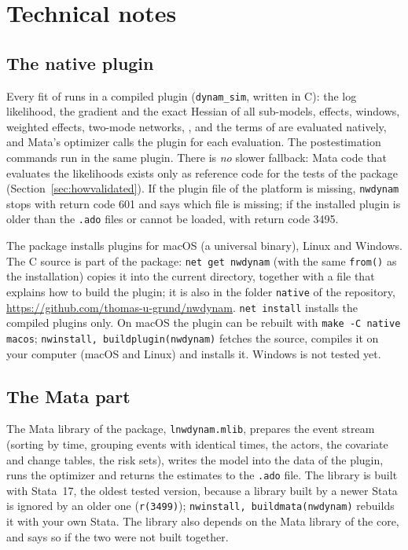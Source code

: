 \chapter{Technical notes}\label{ch:technical}

\section{The native plugin}\label{sec:plugin}

Every fit of \nwdynam{} runs in a compiled plugin (\texttt{dynam\_sim}, written in C): the log likelihood, the gradient and the exact Hessian of all sub-models, effects, windows, weighted effects, two-mode networks, ,  and the terms of  are evaluated natively, and Mata's optimizer calls the plugin for each evaluation. The postestimation commands run in the same plugin. There is \emph{no} slower fallback: Mata code that evaluates the likelihoods exists only as reference code for the tests of the package (Section~\ref{sec:howvalidated}). If the plugin file of the platform is missing, \texttt{nwdynam} stops with return code 601 and says which file is missing; if the installed plugin is older than the \texttt{.ado} files or cannot be loaded, with return code 3495.

The package installs plugins for macOS (a universal binary), Linux and Windows. The C source is part of the package: \texttt{net get nwdynam} (with the same \texttt{from()} as the installation) copies it into the current directory, together with a file that explains how to build the plugin; it is also in the folder \texttt{native} of the repository, \url{https://github.com/thomas-u-grund/nwdynam}. \texttt{net install} installs the compiled plugins only. On macOS the plugin can be rebuilt with \texttt{make -C native macos}; \texttt{nwinstall, buildplugin(nwdynam)} fetches the source, compiles it on your computer (macOS and Linux) and installs it. Windows is not tested yet.

\section{The Mata part}

The Mata library of the package, \texttt{lnwdynam.mlib}, prepares the event stream (sorting by time, grouping events with identical times, the actors, the covariate and change tables, the risk sets), writes the model into the data of the plugin, runs the optimizer and returns the estimates to the \texttt{.ado} file. The library is built with Stata~17, the oldest tested version, because a library built by a newer Stata is ignored by an older one (\texttt{r(3499)}); \texttt{nwinstall, buildmata(nwdynam)} rebuilds it with your own Stata. The library also depends on the Mata library of the core, and \nwdynam{} says so if the two were not built together.

